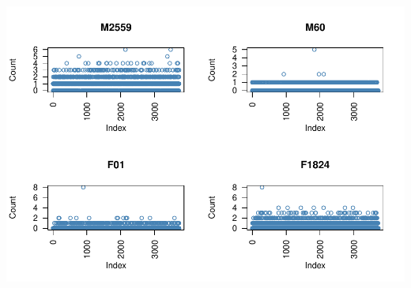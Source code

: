 \documentclass[11pt,]{article}
\begin{document}
\includegraphics{describe_FSMintentions_regional_seasonal_iDE-Camb_surveysOct2017_files/figure-latex/MCA_setup-10.pdf}
\end{document}
